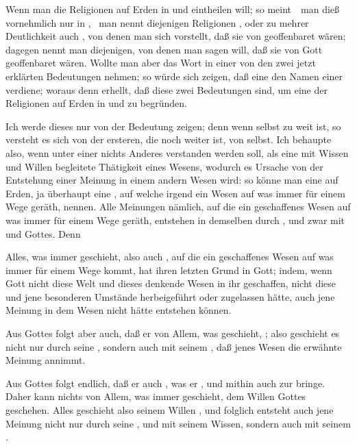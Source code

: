 Wenn man die Religionen auf Erden in  und  eintheilen will; so meint~\ man dieß vornehmlich nur in , \dh\ man nennt diejenigen Religionen , oder zu mehrer Deutlichkeit auch , von denen man sich vorstellt, daß sie von  geoffenbaret wären;  dagegen nennt man diejenigen, von denen man sagen will, daß sie von Gott  geoffenbaret wären. Wollte man aber das Wort  in einer von den zwei jetzt erklärten Bedeutungen nehmen; so würde sich zeigen, daß eine  den Namen einer  verdiene; woraus denn erhellt, daß diese zwei Bedeutungen  sind, um eine  der Religionen auf Erden in  und  zu begründen.\par
Ich werde dieses nur von der  Bedeutung zeigen; denn wenn selbst  zu weit ist, so versteht es sich von der ersteren, die noch weiter ist, von selbst. Ich behaupte also, wenn unter einer  nichts Anderes verstanden werden soll, als eine mit Wissen und Willen begleitete Thätigkeit eines Wesens, wodurch es Ursache von der Entstehung einer Meinung in einem andern Wesen wird: so könne man eine  auf Erden, ja überhaupt eine , auf welche irgend ein  Wesen auf was immer für einem Wege geräth,  nennen. Alle Meinungen nämlich, auf die ein geschaffenes Wesen auf was immer für einem Wege geräth, entstehen in demselben durch , und zwar mit  und  Gottes. Denn
\begin{aufza}[a)]
\item Alles, was immer geschieht, also auch , auf die ein geschaffenes Wesen auf was immer für einem Wege kommt, hat ihren letzten Grund in Gott; indem, wenn Gott nicht diese Welt und dieses denkende Wesen in ihr geschaffen, nicht diese und jene besonderen Umstände herbeigeführt oder zugelassen hätte, auch jene Meinung in dem Wesen nicht hätte entstehen können.~
\item Aus Gottes  folgt aber auch, daß er von Allem, was geschieht, ; also geschieht es nicht nur durch seine , sondern auch mit seinem , daß jenes Wesen die erwähnte Meinung annimmt.
\item Aus Gottes  folgt endlich, daß er auch , was er , und mithin auch zur  bringe. Daher kann nichts von Allem, was immer geschieht, dem Willen Gottes  geschehen. Alles geschieht also seinem Willen , und folglich entsteht auch jene Meinung nicht nur durch seine , und mit seinem Wissen, sondern auch mit seinem .
\end{aufza}

